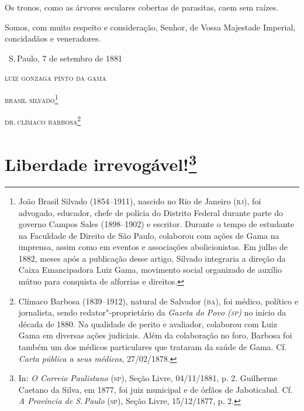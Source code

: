 Os tronos, como as árvores seculares cobertas de parasitas, caem sem
raízes.


Somos, com muito respeito e consideração, Senhor, de Vossa Majestade
Imperial, concidadãos e veneradores.\bigskip

\hfill\ S.\,Paulo, 7 de setembro de 1881\smallskip

\hfill\textsc{luiz gonzaga pinto da gama}

\hfill\textsc{brasil silvado}\footnote{João Brasil Silvado (1854--1911), nascido no
  Rio de Janeiro (\textsc{rj}), foi advogado, educador, chefe de polícia do
  Distrito Federal durante parte do governo Campos Sales (1898--1902) e
  escritor. Durante o tempo de estudante na Faculdade de Direito de São
  Paulo, colaborou com ações de Gama na imprensa, assim como em eventos
  e associações abolicionistas. Em julho de 1882, meses após a
  publicação desse artigo, Silvado integraria a direção da Caixa
  Emancipadora Luiz Gama, movimento social organizado de auxílio mútuo
  para conquista de alforrias e direitos.}

\hfill\textsc{dr.\,clímaco barbosa}\footnote{Clímaco Barbosa (1839--1912), natural de
  Salvador (\textsc{ba}), foi médico, político e jornalista, sendo
  redator"-proprietário da \emph{Gazeta do Povo (\textsc{sp})} no início da década
  de 1880. Na qualidade de perito e avaliador, colaborou com Luiz Gama
  em diversas ações judiciais. Além da colaboração no foro, Barbosa foi
  também um dos médicos particulares que trataram da saúde de Gama. Cf.
  \emph{Carta pública a seus médicos}, 27/02/1878.}


\chapter{Liberdade irrevogável!\footnote[*]{In:
  \emph{O Correio Paulistano} (\textsc{sp}), Seção Livre, 04/11/1881, p. 2.
  Guilherme Caetano da Silva, em 1877, foi juiz municipal e de órfãos de
  Jaboticabal. Cf. \emph{A Província de S.\,Paulo} (\textsc{sp}), Seção Livre,
  15/12/1877, p. 2.}}

